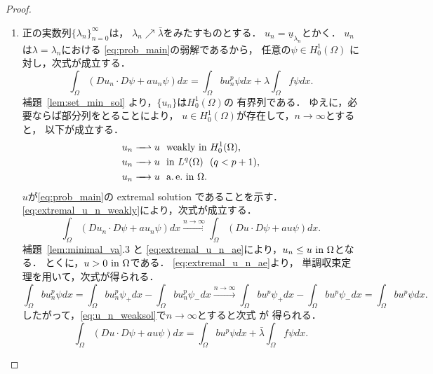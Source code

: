 \begin{proof}
 \begin{enumerate}[1.] \sage
  \item 正の実数列$\{ \lambda_n \}_{n=0}^\infty$は，
        $\lambda_n \nearrow \bar{\lambda}$をみたすものとする．
        $u_n = \underline{u}_{\lambda_n}$とかく．
        $u_n$は$\lambda = \lambda_n$における
         \ref{eq:prob_main}の弱解であるから，
        任意の$\psi \in H_0^1(\Omega)$
        に対し，次式が成立する．
        \begin{equation}
         \int_\Omega (Du_n \cdot D\psi + a u_{n} \psi) dx 
          = \int_\Omega bu_n^p \psi dx + \lambda \int_\Omega f\psi dx.
          \label{eq:u_n_weaksol}
        \end{equation}
        補題~\ref{lem:set_min_sol} より，$\{ u_n \}$は$H_0^1(\Omega)$の
         有界列である．
        ゆえに，必要ならば部分列をとることにより，
        $u \in H_0^1(\Omega)$が存在して，$n \to \infty$とすると，
        以下が成立する．
        \begin{align}
         u_n \xrightharpoonup{ \mbox{ ~ } } u & \ \ \text{weakly~} \tin
         H_0^1(\Omega), \label{eq:extremal_u_n_weakly} \\
         u_n \xrightarrow{ \mbox{ ~ } } u & \ \ \tin L^q(\Omega) \ \
          (q < p+1), \notag \\
         u_n \xrightarrow{ \mbox{ ~ } } u & \ \ \ae \tin \Omega. 
         \label{eq:extremal_u_n_ae}
        \end{align}
        $u$が\ref{eq:prob_main}の extremal solution であることを示す．
        \eqref{eq:extremal_u_n_weakly}により，次式が成立する．
        \[
        \int_\Omega (Du_n \cdot D\psi + a u_n \psi) dx
        \xrightarrow{n \to \infty}
        \int_\Omega (Du \cdot D\psi + a u \psi) dx.
        \]
         補題~\ref{lem:minimal_va}.3 と
        \eqref{eq:extremal_u_n_ae}により，$u_n \leq u ~\text{in}~ \Omega$となる．
        とくに，$u > 0 ~\text{in}~ \Omega$である．
        \eqref{eq:extremal_u_n_ae}より，
        単調収束定理を用いて，次式が得られる．
        \[
        \int_\Omega bu_n^p \psi dx 
        = \int_\Omega bu_n^p \psi_+ dx - 
        \int_\Omega bu_n^p \psi_- dx
        \xrightarrow{n \to \infty}
        \int_\Omega bu^p \psi_+ dx -
        \int_\Omega bu^p \psi_- dx =
        \int_\Omega bu^p \psi dx.
        \]
        したがって，\eqref{eq:u_n_weaksol}で$n \to \infty$とすると次式
        が
        得られる．
        \[ 
         \int_\Omega (Du \cdot D\psi + a u \psi) dx 
          = \int_\Omega bu^p \psi dx + \bar{\lambda} \int_\Omega f\psi dx.
\]
\end{enumerate}
\end{proof}
